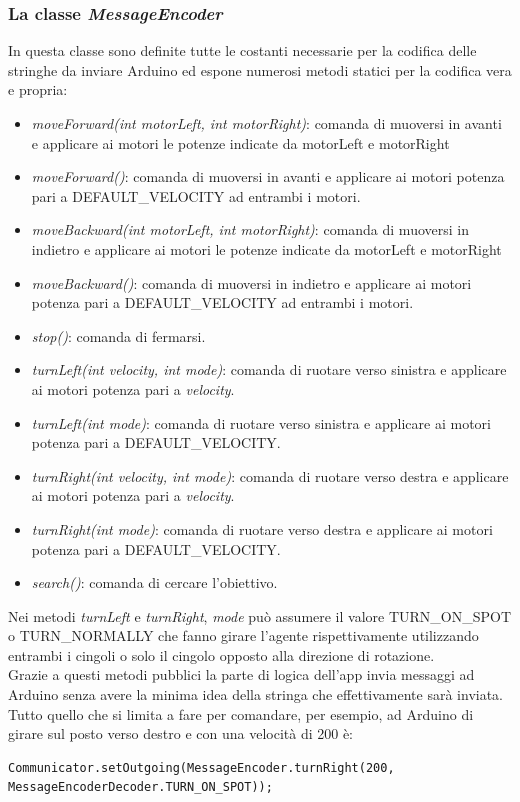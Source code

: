 \subsubsection{La classe \emph{MessageEncoder}}
In questa classe sono definite tutte le costanti necessarie per la codifica delle
stringhe da inviare Arduino ed espone numerosi metodi statici per la codifica vera e propria:
\begin{itemize}
    \item \emph{moveForward(int motorLeft, int motorRight)}: comanda di 
    muoversi in avanti e applicare ai motori le potenze indicate da motorLeft e motorRight
    \item \emph{moveForward()}: comanda di muoversi in avanti e applicare ai motori 
    potenza pari a DEFAULT\_VELOCITY ad entrambi i motori. 
    \item \emph{moveBackward(int motorLeft, int motorRight)}: comanda di 
    muoversi in indietro e applicare ai motori le potenze indicate da motorLeft e motorRight
    \item \emph{moveBackward()}: comanda di muoversi in indietro e applicare ai motori 
    potenza pari a DEFAULT\_VELOCITY ad entrambi i motori. 
    \item \emph{stop()}: comanda di fermarsi.
    \item \emph{turnLeft(int velocity, int mode)}: comanda di ruotare verso 
    sinistra e applicare ai motori potenza pari a \emph{velocity}.
    \item \emph{turnLeft(int mode)}: comanda di ruotare verso 
    sinistra e applicare ai motori potenza pari a DEFAULT\_VELOCITY.   
    \item \emph{turnRight(int velocity, int mode)}: comanda di ruotare verso 
    destra e applicare ai motori potenza pari a \emph{velocity}.
    \item \emph{turnRight(int mode)}: comanda di ruotare verso 
    destra e applicare ai motori potenza pari a DEFAULT\_VELOCITY.  
    \item \emph{search()}: comanda di cercare l'obiettivo.
\end{itemize}
Nei metodi \emph{turnLeft} e \emph{turnRight}, \emph{mode} può assumere il valore 
TURN\_ON\_SPOT o TURN\_NORMALLY che fanno girare l'agente rispettivamente utilizzando 
entrambi i cingoli o solo il cingolo opposto alla direzione di rotazione.\\
Grazie a questi metodi pubblici la parte di logica dell'app invia messaggi ad Arduino
senza avere la minima idea della stringa che effettivamente sarà inviata.\\
Tutto quello che si limita a fare per comandare, per esempio, ad Arduino di girare 
sul posto verso destro e con una velocità di 200 è:
\begin{lstlisting}[caption=Esempio di codifica e invio di un comando ad Arduino]
Communicator.setOutgoing(MessageEncoder.turnRight(200, MessageEncoderDecoder.TURN_ON_SPOT));
\end{lstlisting}

